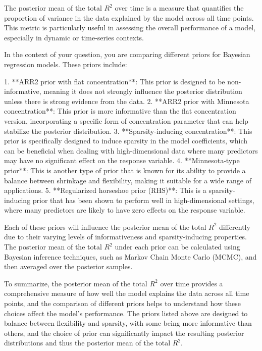 The posterior mean of the total \( R^2 \) over time is a measure that quantifies the proportion of variance in the data explained by the model across all time points. This metric is particularly useful in assessing the overall performance of a model, especially in dynamic or time-series contexts.

In the context of your question, you are comparing different priors for Bayesian regression models. These priors include:

1. **ARR2 prior with flat concentration**: This prior is designed to be non-informative, meaning it does not strongly influence the posterior distribution unless there is strong evidence from the data.
2. **ARR2 prior with Minnesota concentration**: This prior is more informative than the flat concentration version, incorporating a specific form of concentration parameter that can help stabilize the posterior distribution.
3. **Sparsity-inducing concentration**: This prior is specifically designed to induce sparsity in the model coefficients, which can be beneficial when dealing with high-dimensional data where many predictors may have no significant effect on the response variable.
4. **Minnesota-type prior**: This is another type of prior that is known for its ability to provide a balance between shrinkage and flexibility, making it suitable for a wide range of applications.
5. **Regularized horseshoe prior (RHS)**: This is a sparsity-inducing prior that has been shown to perform well in high-dimensional settings, where many predictors are likely to have zero effects on the response variable.

Each of these priors will influence the posterior mean of the total \( R^2 \) differently due to their varying levels of informativeness and sparsity-inducing properties. The posterior mean of the total \( R^2 \) under each prior can be calculated using Bayesian inference techniques, such as Markov Chain Monte Carlo (MCMC), and then averaged over the posterior samples.

To summarize, the posterior mean of the total \( R^2 \) over time provides a comprehensive measure of how well the model explains the data across all time points, and the comparison of different priors helps to understand how these choices affect the model's performance. The priors listed above are designed to balance between flexibility and sparsity, with some being more informative than others, and the choice of prior can significantly impact the resulting posterior distributions and thus the posterior mean of the total \( R^2 \).